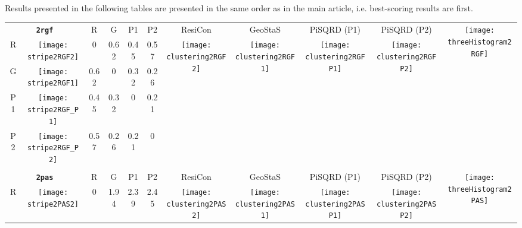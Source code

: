 \documentclass[a4paper,11pt,twoside]{book}%
\begin{document}
\begin{appendices}
Results presented in the following tables are presented in the same order as in the main article, i.e. best-scoring results are first.
\begin{sidewaystable}[h!]
\sffamily
\begin{tabular*}{4cm}{cc|c|c|c|c|c|c|c|c|c|}
\cline{1-11}
\multicolumn{2}{|c|}{{\bf \texttt{2rgf}}} & R & G & P1 & P2 & ResiCon & GeoStaS & PiSQRD (P1) & PiSQRD (P2) & \multirow{5}{*}{\vspace{-0.15cm}\texttt{[image: threeHistogram2RGF]}}  \\
\cline{1-10}
\multicolumn{1}{|c|}{R} & \texttt{[image: stripe2RGF2]} & 0 & 0.62 & 0.45 & 0.57 & \multirow{4}{*}{\vspace{-0.3cm}\texttt{[image: clustering2RGF2]}} & \multirow{4}{*}{\vspace{-0.3cm}\texttt{[image: clustering2RGF1]}} & \multirow{4}{*}{\vspace{-0.3cm}\texttt{[image: clustering2RGFP1]}} & \multirow{4}{*}{\vspace{-0.3cm}\texttt{[image: clustering2RGFP2]}} &  \multirow{5}{*}{} \\
\cline{1-6}
\multicolumn{1}{|c|}{G} & \texttt{[image: stripe2RGF1]} & 0.62 & 0 & 0.32 & 0.26 & \multirow{4}{*}{} & \multirow{4}{*}{} & \multirow{4}{*}{} & \multirow{4}{*}{} & \multirow{5}{*}{} \\
\cline{1-6}
\multicolumn{1}{|c|}{P1} & \texttt{[image: stripe2RGF\_P1]} & 0.45 & 0.32 & 0 & 0.21 & \multirow{4}{*}{} & \multirow{4}{*}{} & \multirow{4}{*}{} & \multirow{4}{*}{} & \multirow{5}{*}{}  \\
\cline{1-6}
\multicolumn{1}{|c|}{P2} & \texttt{[image: stripe2RGF\_P2]} & 0.57 & 0.26 & 0.21 & 0 & \multirow{4}{*}{} & \multirow{4}{*}{} & \multirow{4}{*}{} & \multirow{4}{*}{} & \multirow{5}{*}{}  \\
\cline{1-11}
\\
\cline{1-11}
\multicolumn{2}{|c|}{{\bf \texttt{2pas}}} & R & G & P1 & P2 & ResiCon & GeoStaS & PiSQRD (P1) & PiSQRD (P2) & \multirow{5}{*}{\vspace{-0.15cm}\texttt{[image: threeHistogram2PAS]}}  \\
\cline{1-10}
\multicolumn{1}{|c|}{R} & \texttt{[image: stripe2PAS2]} & 0 & 1.94 & 2.39 & 2.45 & \multirow{4}{*}{\vspace{-0.3cm}\texttt{[image: clustering2PAS2]}} & \multirow{4}{*}{\vspace{-0.3cm}\texttt{[image: clustering2PAS1]}} & \multirow{4}{*}{\vspace{-0.3cm}\texttt{[image: clustering2PASP1]}} & \multirow{4}{*}{\vspace{-0.3cm}\texttt{[image: clustering2PASP2]}} &  \multirow{5}{*}{} \\

\end{tabular*}
\end{sidewaystable}
\end{appendices}
\end{document}
